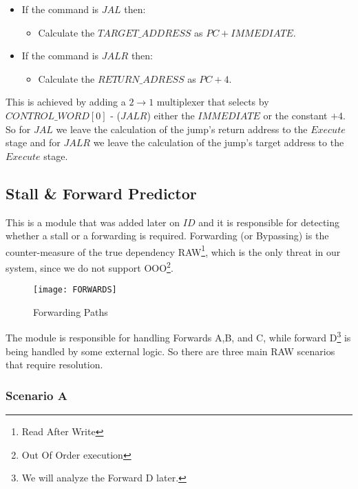 \begin{itemize}
	\setlength\itemsep{-0.1em}
	\item If the command is $JAL$ then:
		\begin{itemize}
			\item Calculate the $TARGET\_ADDRESS$ as $PC+IMMEDIATE$.
		\end{itemize}
	\item If the command is $JALR$ then:
		\begin{itemize}
			\item Calculate the $RETURN\_ADRESS$ as $PC+4$.
		\end{itemize}
\end{itemize}

\vspace{2mm}

This is achieved by adding a $2\rightarrow1$ multiplexer that selects by $CONTROL\_WORD[0]$ - ($JALR$) either the $IMMEDIATE$ or the constant $+4$. So for $JAL$ we leave the calculation of the jump's return address to the $Execute$ stage and for $JALR$ we leave the calculation of the jump's target address to the $Execute$ stage.

\subsection{\textcolor{ao}{Stall \& Forward Predictor}}
\label{SubSec3.2.6:STALLFWD}
This is a module that was added later on $ID$ and it is responsible for detecting whether a stall or a forwarding is required. Forwarding (or Bypassing) is the counter-measure of the true dependency RAW\footnote{Read After Write}, which is the only threat in our system, since we do not support OOO\footnote{Out Of Order execution}.

\begin{figure}[h!]
	\begin{center}
		\texttt{[image: FORWARDS]}
		\caption{Forwarding Paths}
		\label{Image3.4}
	\end{center}
\end{figure}
\vspace{2mm}

The module is responsible for handling Forwards A,B, and C, while forward D\footnote{We will analyze the Forward D later.} is being handled by some external logic. So there are three main RAW scenarios that require resolution.

\subsubsection{Scenario A} 
\label{3.2.6.1}

